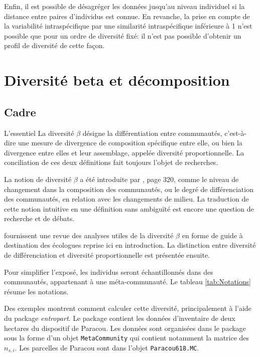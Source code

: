 \documentclass[
  11pt,
  french,
  a4paper,
  extrafontsizes,onecolumn,openright
  ]{memoir}
\newenvironment{Summary}
  {\begin{bclogo}[logo=\bctrombone, noborder=true, couleur=lightgray!50]{L'essentiel}\parindent0pt}
  {\end{bclogo}}
\begin{document}
Enfin, il est possible de désagréger les données jusqu'au niveau individuel si la distance entre paires d'individus est connue.
En revanche, la prise en compte de la variabilité intraspécifique par une similarité intraspécifique inférieure à 1 n'est possible que pour un ordre de diversité fixé: il n'est pas possible d'obtenir un profil de diversité de cette façon.

\part{Diversité beta et décomposition}\label{part-diversituxe9-beta-et-duxe9composition}

\chapter{Cadre}\label{sec-betaCadre}

\begin{Summary}
La diversité \(\beta\) désigne la différentiation entre communautés, c'est-à-dire une mesure de divergence de composition spécifique entre elle, ou bien la divergence entre elles et leur assemblage, appelée diversité proportionnelle.
La conciliation de ces deux définitions fait toujours l'objet de recherches.

\end{Summary}

La notion de diversité \(\beta\) a été introduite par \textcite{Whittaker1960}, page 320, comme le niveau de changement dans la composition des communautés, ou le degré de différenciation des communautés, en relation avec les changements de milieu.
La traduction de cette notion intuitive en une définition sans ambiguïté est encore une question de recherche et de débats.

\textcite{Anderson2011} fournissent une revue des analyses utiles de la diversité \(\beta\) en forme de guide à destination des écologues reprise ici en introduction.
La distinction entre diversité de différenciation et diversité proportionnelle est présentée ensuite.

Pour simplifier l'exposé, les individus seront échantillonnés dans des communautés, appartenant à une méta-communauté.
Le tableau \ref{tab:Notations} résume les notations.

Des exemples montrent comment calculer cette diversité, principalement à l'aide du package \emph{entropart}.
Le package contient les données d'inventaire de deux hectares du dispositif de Paracou.
Les données sont organisées dans le package sous la forme d'un objet \texttt{MetaCommunity} qui contient notamment la matrice des \(n_{s,i}\).
Les parcelles de Paracou sont dans l'objet \texttt{Paracou618.MC}.
\end{document}
